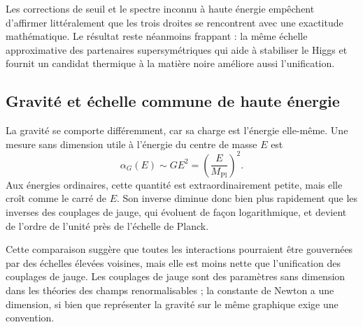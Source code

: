 Les corrections de seuil et le spectre inconnu à haute énergie empêchent d’affirmer littéralement que les trois droites se rencontrent avec une exactitude mathématique. Le résultat reste néanmoins frappant : la même échelle approximative des partenaires supersymétriques qui aide à stabiliser le Higgs et fournit un candidat thermique à la matière noire améliore aussi l’unification.

\subsection{Gravité et échelle commune de haute énergie}

La gravité se comporte différemment, car sa charge est l’énergie elle-même. Une mesure sans dimension utile à l’énergie du centre de masse \(E\) est
\begin{equation}
\alpha_G(E)\sim GE^2
=\left(\frac{E}{M_{\mathrm{Pl}}}\right)^2.
\end{equation}
Aux énergies ordinaires, cette quantité est extraordinairement petite, mais elle croît comme le carré de \(E\). Son inverse diminue donc bien plus rapidement que les inverses des couplages de jauge, qui évoluent de façon logarithmique, et devient de l’ordre de l’unité près de l’échelle de Planck.

Cette comparaison suggère que toutes les interactions pourraient être gouvernées par des échelles élevées voisines, mais elle est moins nette que l’unification des couplages de jauge. Les couplages de jauge sont des paramètres sans dimension dans les théories des champs renormalisables ; la constante de Newton a une dimension, si bien que représenter la gravité sur le même graphique exige une convention.

\begin{classroomqa}
\end{classroomqa}

\begin{classroomqa}
\end{classroomqa}

